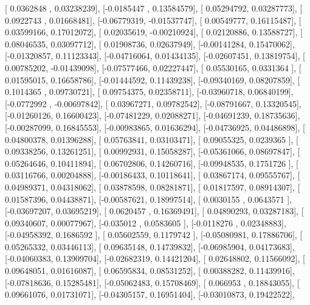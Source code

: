 \documentclass{article}
\begin{document}
       [ 0.0362848 ,  0.03238239],
       [-0.0185447 ,  0.13584579],
       [ 0.05294792,  0.03287773],
       [ 0.0922743 ,  0.01668481],
       [-0.06779319, -0.01537747],
       [ 0.00549777,  0.16115487],
       [ 0.03599166,  0.17012072],
       [ 0.02035619, -0.00210924],
       [ 0.02120886,  0.13588727],
       [ 0.08046535,  0.03097712],
       [ 0.01908736,  0.02637949],
       [-0.00141284,  0.15470062],
       [-0.01320857,  0.11123343],
       [-0.04716064,  0.01434135],
       [-0.02607451,  0.13819754],
       [ 0.00785202, -0.01439098],
       [-0.07577466,  0.02227447],
       [ 0.05530165,  0.0331364 ],
       [ 0.01595015,  0.16658786],
       [-0.01444592,  0.11439238],
       [-0.09340169,  0.08207859],
       [ 0.1014365 ,  0.09730721],
       [ 0.09754375,  0.02358711],
       [-0.03960718,  0.06840199],
       [-0.0772992 , -0.00697842],
       [ 0.03967271,  0.09782542],
       [-0.08791667,  0.13320545],
       [-0.01260126,  0.16600423],
       [-0.07481229,  0.02088271],
       [-0.04691239,  0.18735636],
       [-0.00287099,  0.16845553],
       [-0.00983865,  0.01636294],
       [-0.04736925,  0.04486898],
       [ 0.04800378,  0.01396288],
       [ 0.05763841,  0.03103471],
       [ 0.09055325,  0.0239365 ],
       [ 0.09338256,  0.13261251],
       [ 0.00992931,  0.15058287],
       [-0.05361066,  0.08697847],
       [ 0.05264646,  0.10411894],
       [ 0.06702806,  0.14260716],
       [-0.09948535,  0.1751726 ],
       [ 0.03116766,  0.00204888],
       [-0.00186433,  0.10118641],
       [ 0.03867174,  0.09555767],
       [ 0.04989371,  0.04318062],
       [ 0.03878598,  0.08281871],
       [ 0.01817597,  0.08914307],
       [ 0.01587396,  0.04438871],
       [-0.00587621,  0.18997514],
       [ 0.0030155 ,  0.0643571 ],
       [-0.03697207,  0.03695219],
       [ 0.0620457 ,  0.16369491],
       [ 0.04890293,  0.03287183],
       [ 0.09340607,  0.00077967],
       [-0.035012  ,  0.0583605 ],
       [-0.0118276 ,  0.02348883],
       [-0.04958392,  0.1686592 ],
       [ 0.05602559,  0.1179742 ],
       [-0.05080981,  0.17886706],
       [ 0.05265332,  0.03446113],
       [ 0.09635148,  0.14739832],
       [-0.06985904,  0.04173683],
       [-0.04060383,  0.13909704],
       [-0.02682319,  0.14421204],
       [ 0.02648802,  0.11566092],
       [ 0.09648051,  0.01616087],
       [ 0.06595834,  0.08531252],
       [ 0.00388282,  0.11439916],
       [-0.07818636,  0.15285481],
       [-0.05062483,  0.15708469],
       [ 0.066953  ,  0.18843055],
       [ 0.09661076,  0.01731071],
       [-0.04305157,  0.16951404],
       [-0.03010873,  0.19422522],
\end{document}
